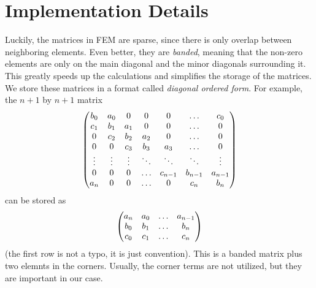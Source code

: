 \documentclass[12pt]{article}
\begin{document}
\section{Implementation Details}
Luckily, the matrices in FEM are sparse, since there is only overlap between neighboring elements.
Even better, they are \emph{banded}, meaning that the non-zero elements are only on the main
diagonal and the minor diagonals surrounding it. This greatly speeds up the calculations and
simplifies the storage of the matrices. We store these matrices in a format called \emph{diagonal
ordered form}. For example, the $n+1$ by $n+1$ matrix
\begin{equation}
    \mqty(b_0 & a_0 & 0 & 0 & 0 & \dots & c_0 \\
          c_1 & b_1 & a_1 & 0 & 0 & \dots & 0 \\
          0 & c_2 & b_2 & a_2 & 0 & \dots & 0 \\
          0 & 0 & c_3 & b_3 & a_3 & \dots & 0 \\
          \vdots & \vdots & \vdots & \ddots & \ddots & \ddots & \vdots \\
          0 & 0 & 0 & \dots & c_{n-1} & b_{n-1} & a_{n-1} \\
          a_n & 0 & 0 & \dots & 0 & c_n & b_n \\)
\end{equation}
can be stored as
\begin{equation}
    \mqty(a_n & a_0 & \dots & a_{n-1} \\ b_0 & b_1 & \dots & b_n \\ c_0 & c_1 & \dots & c_n)
\end{equation}
(the first row is not a typo, it is just convention). This is a banded matrix plus two elemnts in
the corners. Usually, the corner terms are not utilized, but they are important in our case.
\end{document}
